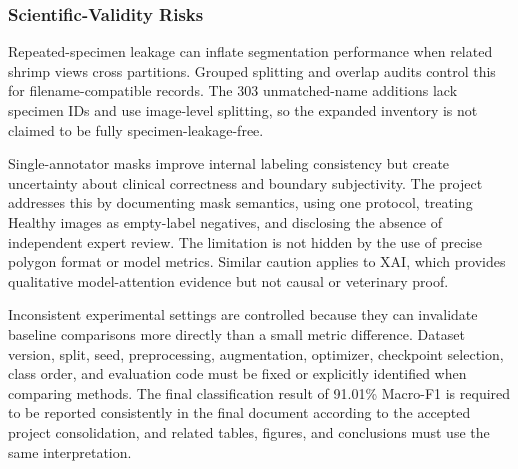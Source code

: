 \subsubsection{Scientific-Validity Risks}
Repeated-specimen leakage can inflate segmentation performance when related shrimp views cross partitions. Grouped splitting and overlap audits control this for filename-compatible records. The 303 unmatched-name additions lack specimen IDs and use image-level splitting, so the expanded inventory is not claimed to be fully specimen-leakage-free.\par
Single-annotator masks improve internal labeling consistency but create uncertainty about clinical correctness and boundary subjectivity. The project addresses this by documenting mask semantics, using one protocol, treating Healthy images as empty-label negatives, and disclosing the absence of independent expert review. The limitation is not hidden by the use of precise polygon format or model metrics. Similar caution applies to XAI, which provides qualitative model-attention evidence but not causal or veterinary proof.\par
Inconsistent experimental settings are controlled because they can invalidate baseline comparisons more directly than a small metric difference. Dataset version, split, seed, preprocessing, augmentation, optimizer, checkpoint selection, class order, and evaluation code must be fixed or explicitly identified when comparing methods. The final classification result of 91.01\% Macro-F1 is required to be reported consistently in the final document according to the accepted project consolidation, and related tables, figures, and conclusions must use the same interpretation.\par
